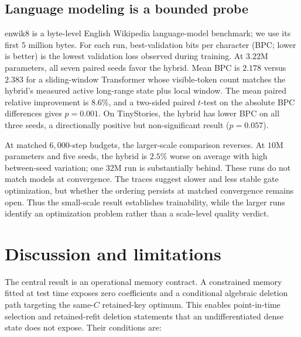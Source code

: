 \subsection{Language modeling is a bounded probe}\label{sec:quality}

enwik8 is a byte-level English Wikipedia language-model benchmark; we use its
first \(5\) million bytes. For each run, best-validation bits per character
(BPC; lower is better) is the lowest validation loss observed during training.
At \(3.22\)M parameters, all seven paired seeds favor the hybrid. Mean BPC is
\(2.178\) versus \(2.383\) for a sliding-window Transformer whose
visible-token count matches the hybrid's measured active long-range state plus
local window. The mean paired relative improvement is \(8.6\%\), and a
two-sided paired \(t\)-test on the absolute BPC differences gives
\(p=0.001\). On TinyStories, the hybrid has lower BPC on all three seeds, a
directionally positive but non-significant result (\(p=0.057\)).

At matched \(6{,}000\)-step budgets, the larger-scale comparison reverses. At
\(10\)M parameters and five seeds, the hybrid is \(2.5\%\) worse on average
with high between-seed variation; one \(32\)M run is substantially behind.
These runs do not match models at convergence. The traces suggest slower and
less stable gate optimization, but whether the ordering persists at matched
convergence remains open. Thus the small-scale result establishes trainability,
while the larger runs identify an optimization problem rather than a
scale-level quality verdict.

\section{Discussion and limitations}\label{sec:limitations}

The central result is an operational memory contract. A constrained memory
fitted at test time exposes zero coefficients and a conditional algebraic
deletion path targeting the same-\(C\) retained-key optimum. This enables
point-in-time selection and retained-refit deletion statements that an
undifferentiated dense state does not expose. Their conditions are:

